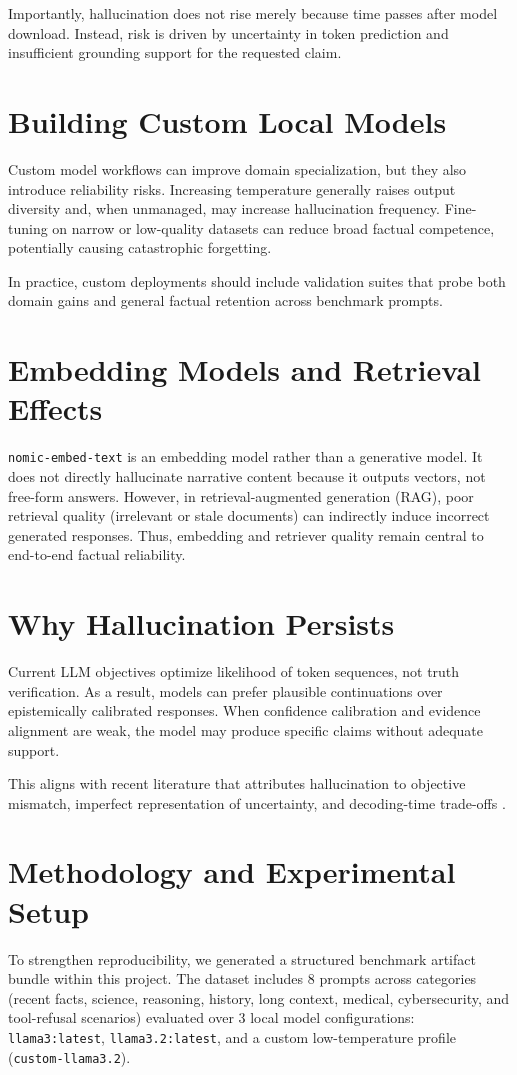 \documentclass[conference]{IEEEtran}
\begin{document}
Importantly, hallucination does not rise merely because time passes after model download. Instead, risk is driven by uncertainty in token prediction and insufficient grounding support for the requested claim.

\section{Building Custom Local Models}
Custom model workflows can improve domain specialization, but they also introduce reliability risks. Increasing temperature generally raises output diversity and, when unmanaged, may increase hallucination frequency. Fine-tuning on narrow or low-quality datasets can reduce broad factual competence, potentially causing catastrophic forgetting.

In practice, custom deployments should include validation suites that probe both domain gains and general factual retention across benchmark prompts.

\section{Embedding Models and Retrieval Effects}
\texttt{nomic-embed-text} is an embedding model rather than a generative model. It does not directly hallucinate narrative content because it outputs vectors, not free-form answers. However, in retrieval-augmented generation (RAG), poor retrieval quality (irrelevant or stale documents) can indirectly induce incorrect generated responses. Thus, embedding and retriever quality remain central to end-to-end factual reliability.

\section{Why Hallucination Persists}
Current LLM objectives optimize likelihood of token sequences, not truth verification. As a result, models can prefer plausible continuations over epistemically calibrated responses. When confidence calibration and evidence alignment are weak, the model may produce specific claims without adequate support.

This aligns with recent literature that attributes hallucination to objective mismatch, imperfect representation of uncertainty, and decoding-time trade-offs \cite{b3,b4}.

\section{Methodology and Experimental Setup}
To strengthen reproducibility, we generated a structured benchmark artifact bundle within this project. The dataset includes 8 prompts across categories (recent facts, science, reasoning, history, long context, medical, cybersecurity, and tool-refusal scenarios) evaluated over 3 local model configurations: \texttt{llama3:latest}, \texttt{llama3.2:latest}, and a custom low-temperature profile (\texttt{custom-llama3.2}).
\end{document}
